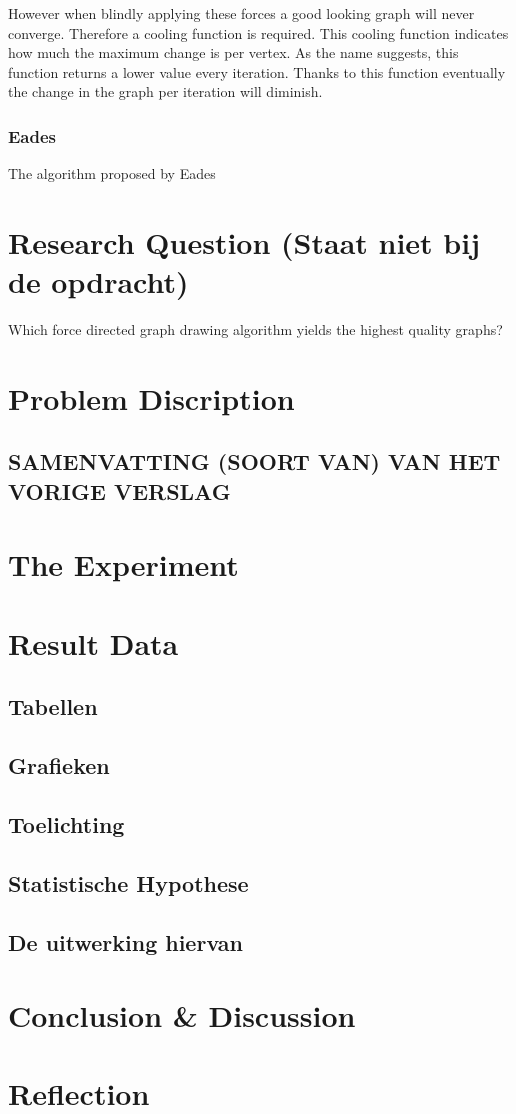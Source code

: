 \documentclass[a4paper,12pt]{article}
\begin{document}
    However when blindly applying these forces a good looking graph will never converge.
    Therefore a cooling function is required.
    This cooling function indicates how much the maximum change is per vertex.
    As the name suggests, this function returns a lower value every iteration.
    Thanks to this function eventually the change in the graph per iteration will diminish.

    \subsubsection{Eades}

    The algorithm proposed by Eades

  \section{Research Question (Staat niet bij de opdracht)}   %
    Which force directed graph drawing algorithm yields the highest quality graphs?

  \section{Problem Discription}
  \subsection{SAMENVATTING (SOORT VAN) VAN HET VORIGE VERSLAG}

  \section{The Experiment} %

  \section{Result Data} %
  \subsection{Tabellen} %
  \subsection{Grafieken}
  \subsection{Toelichting}
  \subsection{Statistische Hypothese}
  \subsection{De uitwerking hiervan}

  \section{Conclusion \& Discussion}
  \section{Reflection}

  {}
  
\end{document}
